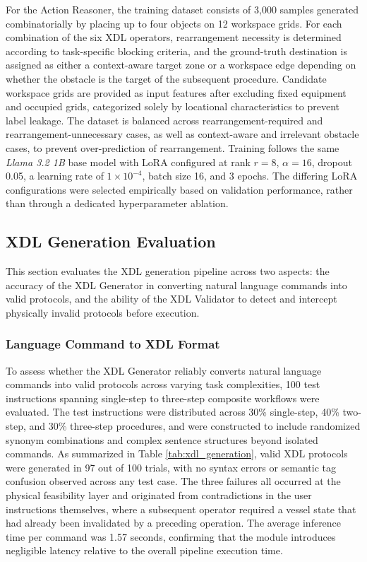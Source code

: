 \documentclass{ieeeaccess}
\begin{document}
For the Action Reasoner, the training dataset consists of 3,000 samples generated combinatorially by placing up to four objects on 12 workspace grids. For each combination of the six XDL operators, rearrangement necessity is determined according to task-specific blocking criteria, and the ground-truth destination is assigned as either a context-aware target zone or a workspace edge depending on whether the obstacle is the target of the subsequent procedure. Candidate workspace grids are provided as input features after excluding fixed equipment and occupied grids, categorized solely by locational characteristics to prevent label leakage. The dataset is balanced across rearrangement-required and rearrangement-unnecessary cases, as well as context-aware and irrelevant obstacle cases, to prevent over-prediction of rearrangement. Training follows the same \textit{Llama 3.2 1B} base model with LoRA configured at rank $r = 8$, $\alpha = 16$, dropout 0.05, a learning rate of $1 \times 10^{-4}$, batch size 16, and 3 epochs. The differing LoRA configurations were selected empirically based on validation performance, rather than through a dedicated hyperparameter ablation.



\subsection{XDL Generation Evaluation}\label{sec:4.2}
This section evaluates the XDL generation pipeline across two aspects: the accuracy of the XDL Generator in converting natural language commands into valid protocols, and the ability of the XDL Validator to detect and intercept physically invalid protocols before execution.

\subsubsection{Language Command to XDL Format}\label{sec:4.2.1}
To assess whether the XDL Generator reliably converts natural language commands into valid protocols across varying task complexities, 100 test instructions spanning single-step to three-step composite workflows were evaluated. The test instructions were distributed across 30\% single-step, 40\% two-step, and 30\% three-step procedures, and were constructed to include randomized synonym combinations and complex sentence structures beyond isolated commands. As summarized in Table \ref{tab:xdl_generation}, valid XDL protocols were generated in 97 out of 100 trials, with no syntax errors or semantic tag confusion observed across any test case. The three failures all occurred at the physical feasibility layer and originated from contradictions in the user instructions themselves, where a subsequent operator required a vessel state that had already been invalidated by a preceding operation. The average inference time per command was 1.57 seconds, confirming that the module introduces negligible latency relative to the overall pipeline execution time.
\end{document}
